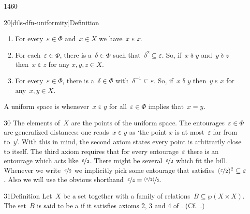 \begin{parsec}{1460}
\begin{point}{20}[dils-dfn-uniformity]{Definition}
\begin{enumerate}
    \item
        For every~$\varepsilon \in \Phi$
            and~$x \in X$ we have~$x \mathrel\varepsilon x$.
    \item
        For each~$\varepsilon \in \Phi$,
            there is a~$\delta \in \Phi$
            such that~$\delta^2 \subseteq \varepsilon$.
        So, if~$x \mathrel\delta y$ and~$y \mathrel\delta z$
            then~$x \mathrel\varepsilon z$ for any $x,y,z \in X$.
    \item
        For every~$\varepsilon \in \Phi$,
            there is a~$\delta \in \Phi$
                with~$\delta^{-1}\subseteq \varepsilon$.
        So, if~$x \mathrel\delta y$ then~$y \mathrel\varepsilon x$
            for any~$x,y \in X$.
    \end{enumerate}
    A uniform space is 
        whenever~$x \mathrel\varepsilon y$
            for all~$\varepsilon \in \Phi$
            implies that~$x=y$.
\begin{point}{30}%
The elements of~$X$ are the points of the uniform space.
The entourages~$\varepsilon \in \Phi$
    are generalized distances:
one reads~$x \mathrel\varepsilon y$ as
    `the point $x$ is at most~$\varepsilon$ far from to~$y$'.
With this in mind, the second axiom states every point is arbitrarily close
    to itself.
The third axiom requires that for every entourage~$\varepsilon$
    there is an entourage which acts like~$\nicefrac{\varepsilon}{2}$.
There might be several~$\nicefrac{\varepsilon}{2}$
    which fit the bill.
Whenever we write~$\nicefrac{\varepsilon}{2}$
    we implicitly pick some entourage that
    satisfies~$(\nicefrac{\varepsilon}{2})^2 \subseteq \varepsilon$.
Also we will use the obvious shorthand~$\nicefrac{\varepsilon}{4}
=   \nicefrac{(\nicefrac{\varepsilon}{2})}{2}$.
\end{point}
\end{point}
\begin{point}{31}{Definition}%
Let~$X$ be a set together with
    a family of relations~$B \subseteq \wp (X \times X)$.
The set~$B$ is said to be a 
    if it satisfies axioms 2, 3 and 4
    of . (Cf.~\cite[dfn.~5.5]{willard}.)
\end{point}

\end{parsec}

